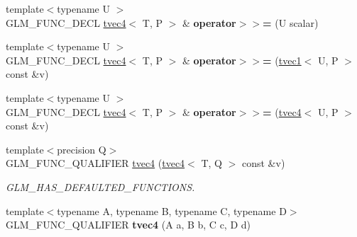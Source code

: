 \begin{DoxyCompactItemize}
\item 
\hypertarget{structglm_1_1tvec4_a6864c1240c7b96bc2ece0dca52eeaa78}{{\footnotesize template$<$typename U $>$ }\\G\-L\-M\-\_\-\-F\-U\-N\-C\-\_\-\-D\-E\-C\-L \hyperlink{structglm_1_1tvec4}{tvec4}$<$ T, P $>$ \& {\bfseries operator$>$$>$=} (U scalar)}\label{structglm_1_1tvec4_a6864c1240c7b96bc2ece0dca52eeaa78}

\item 
\hypertarget{structglm_1_1tvec4_a941c7db66248a949a46e398b8f9f15ce}{{\footnotesize template$<$typename U $>$ }\\G\-L\-M\-\_\-\-F\-U\-N\-C\-\_\-\-D\-E\-C\-L \hyperlink{structglm_1_1tvec4}{tvec4}$<$ T, P $>$ \& {\bfseries operator$>$$>$=} (\hyperlink{structglm_1_1tvec1}{tvec1}$<$ U, P $>$ const \&v)}\label{structglm_1_1tvec4_a941c7db66248a949a46e398b8f9f15ce}

\item 
\hypertarget{structglm_1_1tvec4_a36837fd895234f73e2e76aedb39712b2}{{\footnotesize template$<$typename U $>$ }\\G\-L\-M\-\_\-\-F\-U\-N\-C\-\_\-\-D\-E\-C\-L \hyperlink{structglm_1_1tvec4}{tvec4}$<$ T, P $>$ \& {\bfseries operator$>$$>$=} (\hyperlink{structglm_1_1tvec4}{tvec4}$<$ U, P $>$ const \&v)}\label{structglm_1_1tvec4_a36837fd895234f73e2e76aedb39712b2}

\item 
\hypertarget{structglm_1_1tvec4_a883706ce5d50cbb69897612d7eb3a1f0}{{\footnotesize template$<$precision Q$>$ }\\G\-L\-M\-\_\-\-F\-U\-N\-C\-\_\-\-Q\-U\-A\-L\-I\-F\-I\-E\-R \hyperlink{structglm_1_1tvec4_a883706ce5d50cbb69897612d7eb3a1f0}{tvec4} (\hyperlink{structglm_1_1tvec4}{tvec4}$<$ T, Q $>$ const \&v)}\label{structglm_1_1tvec4_a883706ce5d50cbb69897612d7eb3a1f0}

\begin{DoxyCompactList}\small\item\em G\-L\-M\-\_\-\-H\-A\-S\-\_\-\-D\-E\-F\-A\-U\-L\-T\-E\-D\-\_\-\-F\-U\-N\-C\-T\-I\-O\-N\-S. \end{DoxyCompactList}\item 
\hypertarget{structglm_1_1tvec4_a713654e1257a7ef2645596864cffcbfc}{{\footnotesize template$<$typename A, typename B, typename C, typename D$>$ }\\G\-L\-M\-\_\-\-F\-U\-N\-C\-\_\-\-Q\-U\-A\-L\-I\-F\-I\-E\-R {\bfseries tvec4} (A a, B b, C c, D d)}\label{structglm_1_1tvec4_a713654e1257a7ef2645596864cffcbfc}


\end{DoxyCompactItemize}
